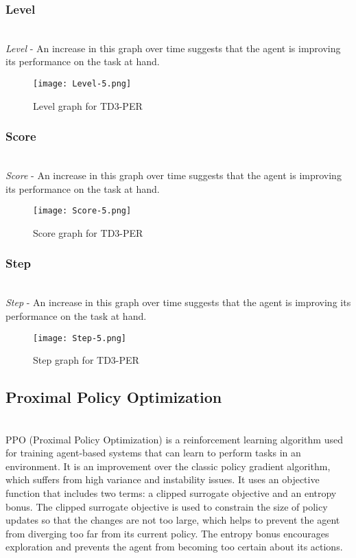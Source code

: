\documentclass[preprint,12pt]{elsarticle}
\begin{document}
\subsubsection{Level}\\
\textit{Level} - An increase in this graph over time suggests that the agent is improving its performance on the task at hand.
\graphicspath{ {./images/} }
\begin{figure}[!htbp]
  \centering
  \texttt{[image: Level-5.png]}
  \caption{Level graph for TD3-PER}
  \label{fig:level-5}
\end{figure}


\subsubsection{Score}\\
\textit{Score} - An increase in this graph over time suggests that the agent is improving its performance on the task at hand.
\graphicspath{ {./images/} }
\begin{figure}[!htbp]
  \centering
  \texttt{[image: Score-5.png]}
  \caption{Score graph for TD3-PER}
  \label{fig:score-5}
\end{figure}


\subsubsection{Step}\\
\textit{Step} - An increase in this graph over time suggests that the agent is improving its performance on the task at hand.
\graphicspath{ {./images/} }
\begin{figure}[!htbp]
  \centering
  \texttt{[image: Step-5.png]}
  \caption{Step graph for TD3-PER}
  \label{fig:step-5}
\end{figure}


\subsection{Proximal Policy Optimization}\\
PPO (Proximal Policy Optimization) is a reinforcement learning algorithm used for training agent-based systems that can learn to perform tasks in an environment. It is an improvement over the classic policy gradient algorithm, which suffers from high variance and instability issues. It uses an objective function that includes two terms: a clipped surrogate objective and an entropy bonus. The clipped surrogate objective is used to constrain the size of policy updates so that the changes are not too large, which helps to prevent the agent from diverging too far from its current policy. The entropy bonus encourages exploration and prevents the agent from becoming too certain about its actions.\\
\end{document}
